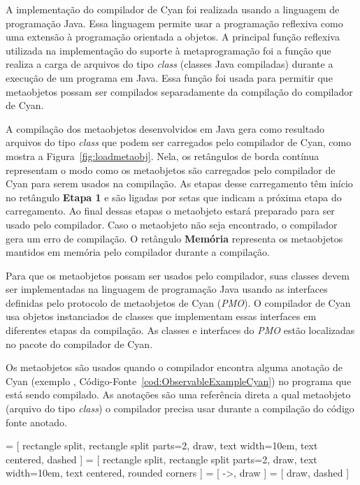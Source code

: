 A implementação do compilador de Cyan foi realizada usando a linguagem de programação Java. Essa linguagem permite usar a programação reflexiva como uma extensão à programação orientada a objetos. A principal função reflexiva utilizada na implementação do suporte à metaprogramação foi a função que realiza a carga de arquivos do tipo \emph{class} (classes Java compiladas) durante a execução de um programa em Java. Essa função foi usada para permitir que metaobjetos possam ser compilados separadamente da compilação do compilador de Cyan.

A compilação dos metaobjetos desenvolvidos em Java gera como resultado arquivos do tipo \emph{class} que podem ser carregados pelo compilador de Cyan, como mostra a Figura~\ref{fig:loadmetaobj}. Nela, os retângulos de borda contínua representam o modo como os metaobjetos são carregados pelo compilador de Cyan para serem usados na compilação. As etapas desse carregamento têm início no retângulo \textbf{Etapa 1} e são ligadas por setas que indicam a próxima etapa do carregamento. Ao final dessas etapas o metaobjeto estará preparado para ser usado pelo compilador. Caso o metaobjeto não seja encontrado, o compilador gera um erro de compilação. O retângulo \textbf{Memória} representa os metaobjetos mantidos em memória pelo compilador durante a compilação.

Para que os metaobjetos possam ser usados pelo compilador, suas classes devem ser implementadas na linguagem de programação Java usando as interfaces definidas pelo protocolo de metaobjetos de Cyan (\emph{PMO}). O compilador de Cyan usa objetos instanciados de classes que implementam essas interfaces em diferentes etapas da compilação. As classes e interfaces do \emph{PMO} estão localizadas no pacote  do compilador de Cyan.

Os metaobjetos são usados quando o compilador encontra alguma anotação de Cyan (exemplo , Código-Fonte~\ref{cod:ObservableExampleCyan}) no programa que está sendo compilado. As anotações são uma referência direta a qual metaobjeto (arquivo do tipo \emph{class}) o compilador precisa usar durante a compilação do código fonte anotado. 

 = [ rectangle split,  rectangle split parts=2, draw, text width=10em, text centered, dashed ]
 = [ rectangle split,  rectangle split parts=2, draw, text width=10em, text centered, rounded corners ]
 = [ ->, draw ]
 = [ draw, dashed ]

